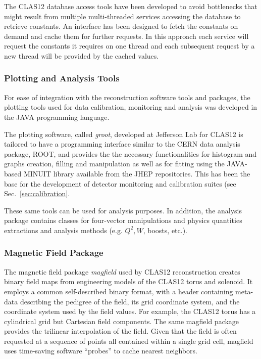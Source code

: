 The CLAS12 database access tools have been developed to avoid bottlenecks that might result from multiple multi-threaded
services accessing the database to retrieve constants.  An interface has been designed to fetch the constants
on demand and cache them for further requests. In this approach each service will request the
constants it requires on one thread and each subsequent request by a new thread will be provided by the cached values.

\subsubsection{Plotting and Analysis Tools}

For ease of integration with the reconstruction software tools and packages, the plotting tools used for data
calibration, monitoring and analysis was developed in the JAVA programming language.

The plotting software, called {\it groot}, developed at Jefferson Lab for CLAS12 is tailored to have a programming
interface similar to the CERN data analysis package, ROOT, and provides the the necessary functionalities for histogram and graphs creation, filling and manipulation as well as for fitting using the JAVA-based MINUIT library available from the JHEP repositories. This has been the base for the development of detector monitoring and calibration suites (see Sec.~\ref{sec:calibration}.

These same tools can be used for analysis purposes. In addition, the analysis package contains classes for four-vector manipulations and physics quantities extractions and
analysis methods (e.g. $Q^2, W$, boosts, etc.).

\subsubsection{Magnetic Field Package}
The magnetic field package {\it magfield} used by CLAS12 reconstruction creates
binary field maps from engineering models of the CLAS12 torus and solenoid. It employs
a common self-described binary format, with a header containing meta-data describing
the pedigree of the field, its grid coordinate system, and the coordinate system
used by the field values. For example, the CLAS12 torus has a cylindrical grid
but Cartesian field components. The same magfield package provides the trilinear
interpolation of the field. Given that the field is often requested at a sequence
of points all contained within a single grid cell, magfield uses time-saving
software “probes” to cache nearest neighbors.

